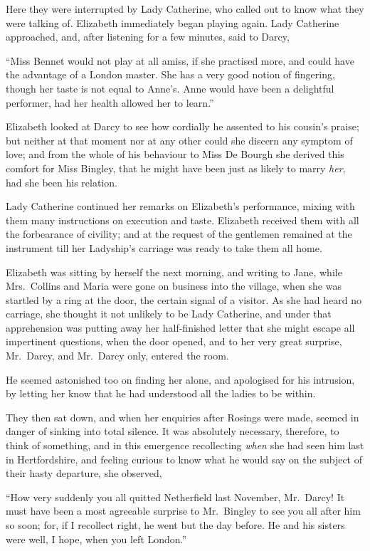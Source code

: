 Here they were interrupted by Lady Catherine, who
called out to know what they were talking of. Elizabeth
immediately began playing again. Lady Catherine
approached, and, after listening for a few minutes, said
to Darcy,

“Miss Bennet would not play at all amiss, if she practised
more, and could have the advantage of a London
master. She has a very good notion of fingering, though
her taste is not equal to Anne’s. Anne would have been
a delightful performer, had her health allowed her to
learn.”

Elizabeth looked at Darcy to see how cordially he
assented to his cousin’s praise; but neither at that
moment nor at any other could she discern any symptom
of love; and from the whole of his behaviour to Miss
De Bourgh she derived this comfort for Miss Bingley,
that he might have been just as likely to marry \textit{her}, had
she been his relation.

Lady Catherine continued her remarks on Elizabeth’s
performance, mixing with them many instructions on
execution and taste. Elizabeth received them with all
the forbearance of civility; and at the request of the
gentlemen remained at the instrument till her Ladyship’s
carriage was ready to take them all home.


Elizabeth was sitting by herself the next morning, and
writing to Jane, while Mrs.\ Collins and Maria were gone
on business into the village, when she was startled by a ring
at the door, the certain signal of a visitor. As she had
heard no carriage, she thought it not unlikely to be
Lady Catherine, and under that apprehension was putting
away her half-finished letter that she might escape all
impertinent questions, when the door opened, and to her
very great surprise, Mr.\ Darcy, and Mr.\ Darcy only,
entered the room.

He seemed astonished too on finding her alone, and
apologised for his intrusion, by letting her know that he
had understood all the ladies to be within.

They then sat down, and when her enquiries after
Rosings were made, seemed in danger of sinking into
total silence. It was absolutely necessary, therefore, to
think of something, and in this emergence recollecting
\textit{when} she had seen him last in Hertfordshire, and feeling
curious to know what he would say on the subject of their
hasty departure, she observed,

“How very suddenly you all quitted Netherfield last
Nov\-ember, Mr.\ Darcy! It must have been a most agreeable
surprise to Mr.\ Bingley to see you all after him so
soon; for, if I recollect right, he went but the day
before. He and his sisters were well, I hope, when you
left London.”

